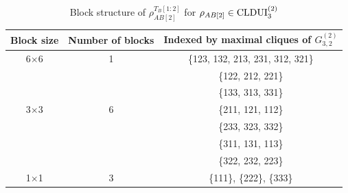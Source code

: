 \documentclass[11pt]{article}
\makeatletter
\newcommand{\N}{\ensuremath{\mathbb{N}}}   %
\newcommand{\CLDUI}{\text{\rm CLDUI}}
\newcommand{\ui}{\underline{i}}
\newcommand{\uj}{\underline{j}}
\theoremstyle{plain}
\newtheorem{lemma}[satz]{Lemma}
\renewenvironment{proof}[1][\proofname]{%
  \par
  \pushQED{}%
  \normalfont
  \topsep6\p@\@plus6\p@
  \trivlist
  \item[\hskip\labelsep\itshape #1\@addpunct{.}]%
}{%
  \popQED
  \endtrivlist
}
\makeatother
\begin{document}
  \bigskip   
\begin{table}[h]     \centering
    \begin{tabular}{c|c|c}
         Block size & Number of blocks & Indexed by maximal cliques of $G_{3,2}^{(2)}$ \\\hline
         6$\times$6 & 1 & \{123, 132, 213, 231, 312, 321\}\\\hline
          &  & \{122, 212, 221\}\\
          &  & \{133, 313, 331\}\\
         3$\times$3 & 6 & \{211, 121, 112\}\\
          & &\{233, 323, 332\}\\
          &  & \{311, 131, 113\}\\
          &  & \{322, 232, 223\}\\\hline
          1$\times$1 & 3 & \{111\}, \{222\}, \{333\}
    \end{tabular}
  \caption{Block structure of $\rho_{AB[2]}^{T_B[1:2]}$ for $\rho_{AB[2]}\in\CLDUI^{(2)}_3$}\label{table2}
 \end{table}



\end{document}
